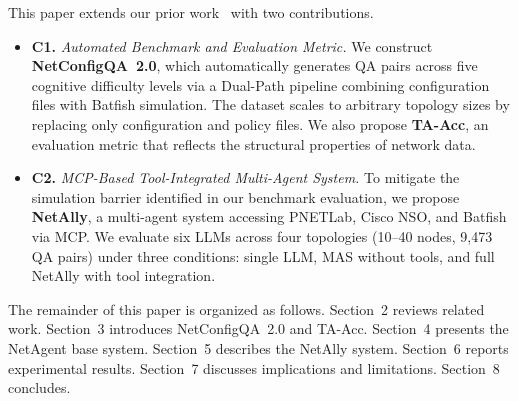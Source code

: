 This paper extends our prior work~\cite{netagent2026} with two contributions.
\begin{itemize}
  \item \textbf{C1.} \emph{Automated Benchmark and Evaluation Metric.}
    We construct \textbf{NetConfigQA~2.0}, which automatically generates QA pairs across five cognitive difficulty levels via a Dual-Path pipeline combining configuration files with Batfish simulation.
    The dataset scales to arbitrary topology sizes by replacing only configuration and policy files.
    We also propose \textbf{TA-Acc}, an evaluation metric that reflects the structural properties of network data.

  \item \textbf{C2.} \emph{MCP-Based Tool-Integrated Multi-Agent System.}
    To mitigate the simulation barrier identified in our benchmark evaluation, we propose \textbf{NetAlly}, a multi-agent system accessing PNETLab, Cisco NSO, and Batfish via MCP.
    We evaluate six LLMs across four topologies (10--40 nodes, 9,473 QA pairs) under three conditions: single LLM, MAS without tools, and full NetAlly with tool integration.
\end{itemize}

The remainder of this paper is organized as follows.
Section~2 reviews related work.
Section~3 introduces NetConfigQA~2.0 and TA-Acc.
Section~4 presents the NetAgent base system.
Section~5 describes the NetAlly system.
Section~6 reports experimental results.
Section~7 discusses implications and limitations.
Section~8 concludes.

